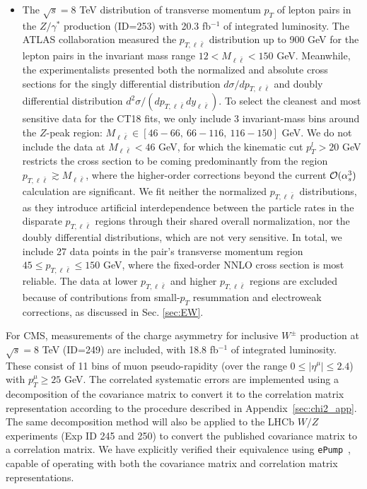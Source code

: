 \begin{itemize}
		
	\item The $\sqrt{s}=8$ TeV distribution of transverse momentum $p_T$ of lepton pairs in the $Z/\gamma^*$ production (ID=253) \cite{Aad:2015auj} with 20.3 fb$^{-1}$ of integrated luminosity. The ATLAS collaboration measured the $p_{T,  \ell \bar \ell}$ distribution up to 900 GeV for the lepton pairs in the invariant mass range $12<M_{\ell \bar \ell}<150$ GeV. Meanwhile, the experimentalists presented both the normalized and absolute cross sections for the singly differential distribution $d\sigma/d p_{T,  \ell \bar \ell}$ and doubly differential distribution $d^2\sigma/(d p_{T,  \ell \bar \ell}d y_{\ell \bar \ell})$. To select the cleanest and most sensitive data for the CT18 fits, 
	we only include 3 invariant-mass bins around the $Z$-peak region: $M_{\ell \bar \ell}\in[46-66,\ 66-116,\ 116-150]$ GeV. We do not include the data at $M_{\ell \bar \ell} < 46$ GeV, for which the kinematic cut $p_T^l>20$ GeV restricts the cross section to be coming predominantly from the region $p_{T,  \ell \bar \ell} \gtrsim M_{\ell \bar \ell}$, where the higher-order corrections beyond the current ${\cal O}(\alpha_s^3)$ calculation are significant. We fit neither the normalized $p_{T,  \ell \bar \ell}$ distributions, as they introduce artificial interdependence between the particle rates in the disparate $p_{T,  \ell \bar \ell}$ regions through their shared overall normalization, nor the doubly differential distributions, which are not very sensitive. 
	In total, we include 27 data points in the pair's transverse momentum region $45\! \leq\! p_{T,  \ell \bar \ell}\! \leq\! 150$ GeV, where the fixed-order NNLO cross section is most reliable. The data at lower $p_{T,  \ell \bar \ell}$ and higher $p_{T,  \ell \bar \ell}$ regions are excluded because of contributions from small-$p_T$ resummation and electroweak corrections, as discussed in Sec. \ref{sec:EW}.
\end{itemize}

For CMS, measurements of the charge asymmetry for inclusive ${W}^{\pm}$ production at ${\sqrt{s}} = 8$ TeV \cite{Khachatryan:2016pev} (ID=249) are included, with 18.8 fb$^{-1}$ of integrated luminosity.
These consist of 11 bins of muon pseudo-rapidity (over the range $0\leq |\eta^\mu|\leq 2.4$) with $p^\mu_T \geq 25$ GeV. The correlated systematic errors are implemented using a decomposition
of the covariance matrix to convert it to the
correlation matrix representation according to the procedure described in Appendix~\ref{sec:chi2_app}.
The same decomposition method will also be applied to the LHCb $W/Z$ experiments (Exp ID 245 and 250) to convert the published covariance matrix to a correlation matrix.
We have explicitly verified their equivalence using \texttt{ePump}~\cite{Hou:2019gfw}, capable of operating with both the covariance matrix and correlation matrix representations. 

